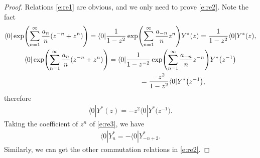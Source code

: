 \documentclass[pdftex]{sigma}
\numberwithin{equation}{section}
\begin{document}
\begin{proof}
Relations \eqref{e:re1} are obvious, and we only need to prove \eqref{e:re2}. Note the fact
\begin{gather*}
\langle 0|\exp\Biggl(\sum^\infty_{n=1}\frac{a_n}{n}(z^{-n}+z^n)\Biggr)=\langle 0|\frac{1}{1-z^2}\exp\Biggl(\sum^\infty_{n=1}\frac{a_{-n}}{n}z^n\Biggr)Y^*(z)
=\frac{1}{1-z^2}\langle 0|Y^*(z),\\
\langle 0|\exp\Biggl(\sum^\infty_{n=1}\frac{a_n}{n}(z^{-n}+z^n)\Biggr)=\langle 0|\frac{1}{1-z^{-2}}\exp\Biggl(\sum^\infty_{n=1}\frac{a_{-n}}{n}z^{-n}\Biggr)Y^*\big(z^{-1}\big)\\
\hphantom{\langle 0|\exp\Biggl(\sum^\infty_{n=1}\frac{a_n}{n}(z^{-n}+z^n)\Biggr)}{}
=\frac{-z^2}{1-z^2}\langle 0|Y^*\big(z^{-1}\big),
\end{gather*}
therefore
\begin{align}
\label{e:re3}\langle 0|Y^*(z)=-z^2\langle 0|Y^*\big(z^{-1}\big).
\end{align}
Taking the coefficient of $z^n$ of \eqref{e:re3}, we have
\begin{align*}
\langle 0|Y^*_n=-\langle 0|Y^*_{-n+2}.
\end{align*}
Similarly, we can get the other commutation relations in \eqref{e:re2}.
\end{proof}
\end{document}
